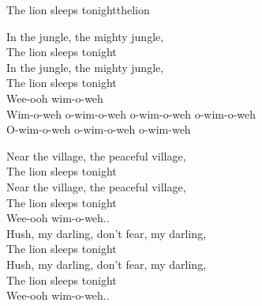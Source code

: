 \begin{song}{The lion sleeps tonight}{thelion}
\begin{vers}
In the jungle, the mighty jungle, \\
The lion sleeps tonight\\
In the jungle, the mighty jungle, \\
The lion sleeps tonight\\
Wee-ooh wim-o-weh\\
\repopen Wim-o-weh o-wim-o-weh o-wim-o-weh o-wim-o-weh\\
O-wim-o-weh o-wim-o-weh o-wim-weh \repclose\\
\end{vers}
\begin{vers}
Near the village, the peaceful village, \\
The lion sleeps tonight\\
Near the village, the peaceful village, \\
The lion sleeps tonight\\
Wee-ooh wim-o-weh..\\
Hush, my darling, don't fear, my darling, \\
The lion sleeps tonight\\
Hush, my darling, don't fear, my darling, \\
The lion sleeps tonight\\
Wee-ooh wim-o-weh..\\
\end{vers}
\end{song}
